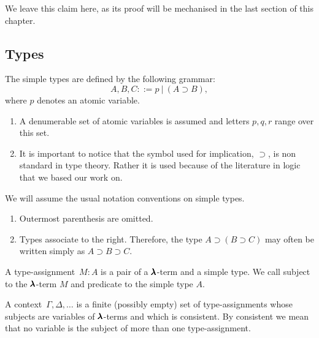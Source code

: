 We leave this claim here, as its proof will be mechanised in the last section of this chapter.


\subsection{Types}

\begin{definition}
  The simple types are defined by the following grammar:  
  \[
    A, B, C ::= p \ | \ (A \supset B),
  \]
  where $p$ denotes an atomic variable.
\end{definition}

\begin{remark} \hfill
  \begin{enumerate}
  \item A denumerable set of atomic variables is assumed and letters $p, q, r$ range over this set.
  \item It is important to notice that the symbol used for implication, $\supset$, is non standard in type theory.
    Rather it is used because of the literature in logic that we based our work on.
  \end{enumerate}
\end{remark}

\begin{notation}
  We will assume the usual notation conventions on simple types. 
  \begin{enumerate}
  \item Outermost parenthesis are omitted.
  \item Types associate to the right. Therefore, the type $A \supset (B \supset C)$ may often be written simply as $A \supset B \supset C$.
  \end{enumerate}
\end{notation}

\begin{definition}
  A type-assignment~$M : A$ is a pair of a $\pmb{\lambda}$-term and a simple type.
  We call subject to the $\pmb{\lambda}$-term $M$ and predicate to the simple type $A$.
\end{definition}

\begin{definition}[Context]
  A context~$\Gamma, \Delta, \dots$ is a finite (possibly empty) set of type-assignments whose subjects are variables of $\pmb{\lambda}$-terms and which is consistent. By consistent we mean that no variable is the subject of more than one type-assignment.
\end{definition}

